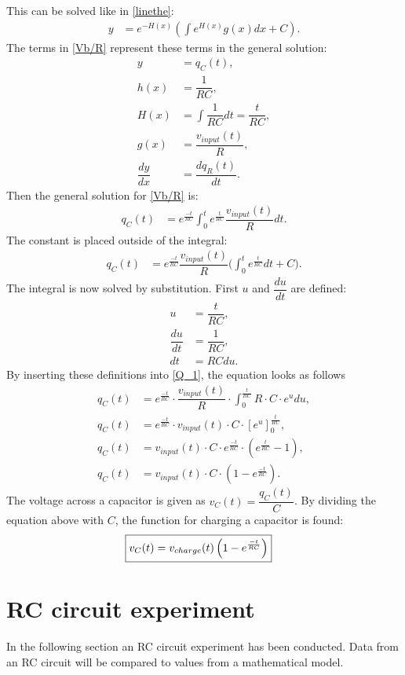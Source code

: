 This can be solved like in \cref{linethe}:
\begin{align*}
y&=e^{-H(x)}\left(\int e^{H(x)}g(x)dx+C\right).
\end{align*}
The terms in \eqref{Vb/R} represent these terms in the general solution:
\begin{align*}
y &= q_C(t),
\\
h(x) &= \dfrac{1}{RC},
\\
H(x) &= \int \dfrac{1}{RC}dt=\dfrac{t}{RC},
\\
g(x) &= \dfrac{v_{input}(t)}{R},
\\
\dfrac{dy}{dx} &= \dfrac{dq_R(t)}{dt}.
\end{align*}
Then the general solution for \eqref{Vb/R} is:
\begin{align*}
q_C(t) &= e^{\frac{-t}{RC}}\int_{0}^{t}e^{\frac{t}{RC}}\dfrac{v_{input}(t)}{R}dt.
\end{align*}
The constant is placed outside of the integral:
\begin{align}
q_C(t) &= e^{\frac{-t}{RC}}\dfrac{v_{input}(t)}{R}\bigg(\int_{0}^{t}e^{\frac{t}{RC}}dt+C \bigg). \label{Q_1}
\end{align}
The integral is now solved by substitution. First $u$ and $\dfrac{du}{dt}$ are defined:
\begin{align*}
u &= \dfrac{t}{RC},
\\
\dfrac{du}{dt}&=\dfrac{1}{RC},
\\
dt &=RC du.
\end{align*} 
By inserting these definitions into \eqref{Q_1}, the equation looks as follows
\begin{align*}
q_C(t) &= e^{\frac{-t}{RC}} \cdot \dfrac{v_{input}(t)}{R}\cdot \int_{0}^{\frac{t}{RC}} R \cdot C \cdot e^u du,
\\
q_C(t) &= e^{\frac{-t}{RC}}\cdot v_{input}(t)\cdot C\cdot \left[e^u\right]_{0}^{\frac{t}{RC}},
\\
q_C(t) &= v_{input}(t) \cdot C\cdot e^{\frac{-t}{RC}}\cdot\left(e^{\frac{t}{RC}}-1\right),
\\
q_C(t) &= v_{input}(t) \cdot C \cdot \left(1-e^{\frac{-t}{RC}}\right).
\end{align*} 
The voltage across a capacitor is given as $v_C(t)=\dfrac{q_C(t)}{C}$. By dividing the equation above with $C$, the function for charging a capacitor is found:
\begin{align}
\label{V_up}
\Aboxed{
v_C(t)=v_{charge}(t)\left(1-e^{\frac{-t}{RC}}\right)
}
\end{align}
\section{RC circuit experiment} \label{c: RC_exp}
In the following section an RC circuit experiment has been conducted. Data from an RC circuit will be compared to values from a mathematical model.

